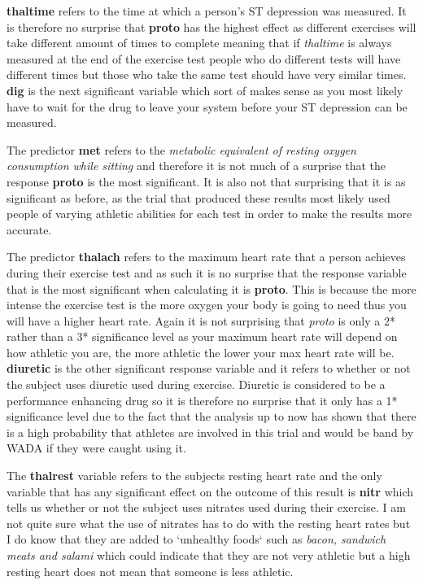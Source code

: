 \documentclass[a4paper]{article}
\begin{document}
\newpage

\textbf{thaltime} refers to the time at which a person's ST depression was
measured. It is therefore no surprise that \textbf{proto} has the highest effect
as different exercises will take different amount of times to complete meaning
that if \textit{thaltime} is always measured at the end of the exercise test
people who do different tests will have different times but those who take the
same test should have very similar times.  \textbf{dig} is the next significant
variable which sort of makes sense as you most likely have to wait for the drug
to leave your system before your ST depression can be measured.

\newpage

The predictor \textbf{met} refers to the \textit{metabolic equivalent of resting
oxygen consumption while sitting} and therefore it is not much of a surprise
that the response \textbf{proto} is the most significant. It is also not that
surprising that it is as significant as before, as the trial that produced these
results most likely used people of varying athletic abilities for each test
in order to make the results more accurate.

\newpage

The predictor \textbf{thalach} refers to the maximum heart rate that a person
achieves during their exercise test and as such it is no surprise that the
response variable that is the most significant when calculating it is
\textbf{proto}. This is because the more intense the exercise test is the more
oxygen your body is going to need thus you will have a higher heart rate. Again
it is not surprising that \textit{proto} is only a 2* rather than a 3*
significance level as your maximum heart rate will depend on how athletic you
are, the more athletic the lower your max heart rate will be. \textbf{diuretic}
is the other significant response variable and it refers to whether or not the
subject uses diuretic used during exercise. Diuretic is considered to be a
performance enhancing drug so it is therefore no surprise that it only has a 1*
significance level due to the fact that the analysis up to now has shown that
there is a high probability that athletes are involved in this trial and would
be band by WADA if they were caught using it.

\newpage

The \textbf{thalrest} variable refers to the subjects resting heart rate and the
only variable that has any significant effect on the outcome of this result is
\textbf{nitr} which tells us whether or not the subject uses nitrates used
during their exercise. I am not quite sure what the use of nitrates has to do
with the resting heart rates but I do know that they are added to `unhealthy
foods` such as \textit{bacon, sandwich meats and salami} which could indicate
that they are not very athletic but a high resting heart does not mean that
someone is less athletic.
\end{document}
